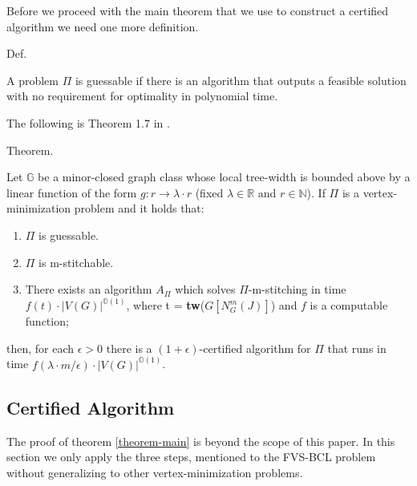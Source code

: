 \noindent Before we proceed with the main theorem that we use to construct a certified algorithm 
we need one more definition.

\begin{mydefinition}[Guessable]{Def.}
    \label{guessable}

    \noindent A problem $\Pi$ is guessable if there is an algorithm that outputs a feasible solution 
    with no requirement for optimality in polynomial time.

\end{mydefinition}

The following is Theorem 1.7 in \cite{bumpus_et_al:LIPIcs.SWAT.2024.19}.

\begin{mydefinition}{Theorem.}
    \label{theorem-main}

    Let $\mathbb{G}$ be a minor-closed graph class whose local tree-width is bounded above by a linear 
    function of the form $g : r \to \lambda \cdot r$ (fixed $\lambda \in \mathbb{R}$ and $r \in \mathbb{N}$).
    If $\Pi$ is a vertex-minimization problem and it holds that:

    \begin{enumerate}
        \item $\Pi$ is guessable.
        \item $\Pi$ is m-stitchable.
        \item There exists an algorithm $A_{\Pi}$ which solves $\Pi$-m-stitching in time $f(t) \cdot  |V(G)|^{\mathbb{O}(1)}$,
        where t = \textbf{tw}($G\left[N^{m}_{G}(J)\right]$) and $f$ is a computable function;
    \end{enumerate}

    then, for each $\epsilon > 0$ there is a $(1 + \epsilon)$-certified algorithm for $\Pi$ that 
    runs in time $f(\lambda \cdot m / \epsilon) \cdot \left|V(G)\right| ^ {\mathbb{O}(1)}$.

\end{mydefinition}

\subsection{Certified Algorithm}

\noindent The proof of theorem \ref{theorem-main} is beyond the scope of this paper. In this section 
we only apply the three steps, mentioned to the FVS-BCL problem without generalizing to other 
vertex-minimization problems. 

